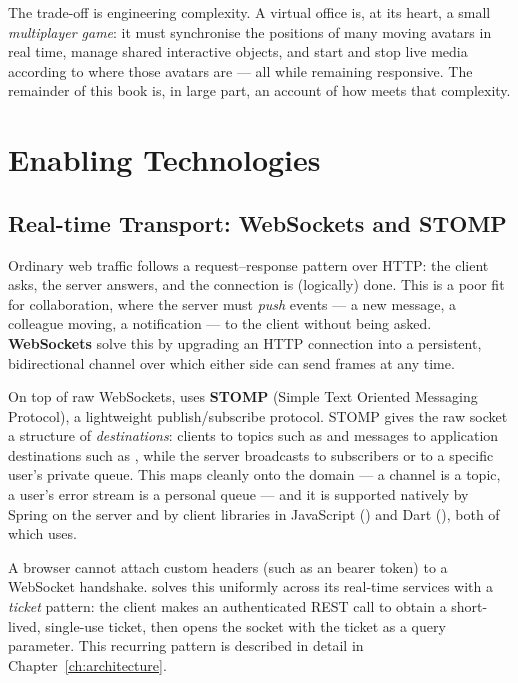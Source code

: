 The trade-off is engineering complexity. A virtual office is, at its heart, a
small \emph{multiplayer game}: it must synchronise the positions of many moving
avatars in real time, manage shared interactive objects, and start and stop live
media according to where those avatars are --- all while remaining responsive.
The remainder of this book is, in large part, an account of how \voname{} meets
that complexity.

\section{Enabling Technologies}

\subsection{Real-time Transport: WebSockets and STOMP}

Ordinary web traffic follows a request--response pattern over HTTP: the client
asks, the server answers, and the connection is (logically) done. This is a poor
fit for collaboration, where the server must \emph{push} events --- a new
message, a colleague moving, a notification --- to the client without being
asked. \textbf{WebSockets} solve this by upgrading an HTTP connection into a
persistent, bidirectional channel over which either side can send frames at any
time.

On top of raw WebSockets, \voname{} uses \textbf{STOMP} (Simple Text Oriented
Messaging Protocol), a lightweight publish/subscribe protocol. STOMP gives the
raw socket a structure of \emph{destinations}: clients  to
topics such as  and  messages to application
destinations such as , while the server broadcasts to
subscribers or to a specific user's private queue. This maps cleanly onto the
domain --- a channel is a topic, a user's error stream is a personal queue ---
and it is supported natively by Spring on the server and by client libraries in
JavaScript () and Dart (), both of
which \voname{} uses.

\begin{infobox}[title=The WebSocket Authentication Problem]
A browser cannot attach custom headers (such as an  bearer
token) to a WebSocket handshake. \voname{} solves this uniformly across its
real-time services with a \emph{ticket} pattern: the client makes an
authenticated REST call to obtain a short-lived, single-use ticket, then opens
the socket with the ticket as a query parameter. This recurring pattern is
described in detail in Chapter~\ref{ch:architecture}.
\end{infobox}

